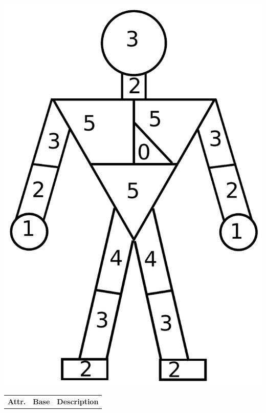 \documentclass{book}
\begin{document}
\begin{center}
  \includegraphics[width=.5\textwidth,height=.5\textheight,keepaspectratio]{military-hitchart.pdf}
\end{center}

\begin{tabular}{l|cp{4in}}
\textbf{Attr.} & \textbf{Base} & \textbf{Description} \\

\end{tabular}
\end{document}
